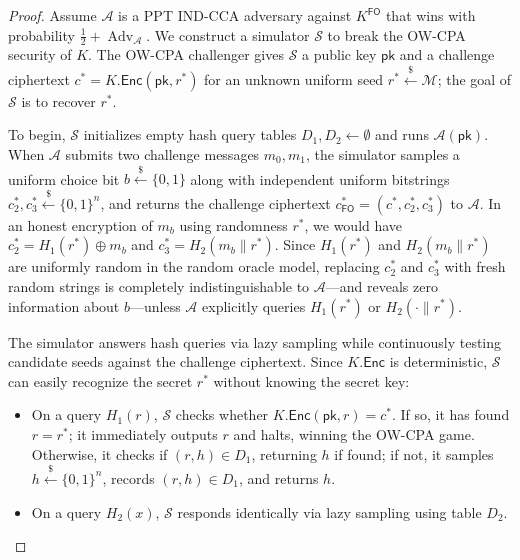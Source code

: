 \begin{proof}
    Assume \(\mathcal{A}\) is a PPT IND-CCA adversary against \(K^{\mathsf{FO}}\) that wins with probability \(\frac{1}{2} + \operatorname{Adv}_{\mathcal{A}}\).
    We construct a simulator \(\mathcal{S}\) to break the OW-CPA security of \(K\).
    The OW-CPA challenger gives \(\mathcal{S}\) a public key \(\mathsf{pk}\) and a challenge ciphertext \(c^* = K.\mathsf{Enc}(\mathsf{pk}, r^*)\) for an unknown uniform seed \(r^* \xleftarrow{\$} \mathcal{M}\); the goal of \(\mathcal{S}\) is to recover \(r^*\).

    To begin, \(\mathcal{S}\) initializes empty hash query tables \(D_1, D_2 \gets \emptyset\) and runs \(\mathcal{A}(\mathsf{pk})\).
    When \(\mathcal{A}\) submits two challenge messages \(m_0, m_1\), the simulator samples a uniform choice bit \(b \xleftarrow{\$} \{0, 1\}\) along with independent uniform bitstrings \(c_2^*, c_3^* \xleftarrow{\$} \{0, 1\}^n\), and returns the challenge ciphertext \(c_{\mathsf{FO}}^* = (c^*, c_2^*, c_3^*)\) to \(\mathcal{A}\).
    In an honest encryption of \(m_b\) using randomness \(r^*\), we would have \(c_2^* = H_1(r^*) \oplus m_b\) and \(c_3^* = H_2(m_b \parallel r^*)\).
    Since \(H_1(r^*)\) and \(H_2(m_b \parallel r^*)\) are uniformly random in the random oracle model, replacing \(c_2^*\) and \(c_3^*\) with fresh random strings is completely indistinguishable to \(\mathcal{A}\)---and reveals zero information about \(b\)---unless \(\mathcal{A}\) explicitly queries \(H_1(r^*)\) or \(H_2(\cdot \parallel r^*)\).

    The simulator answers hash queries via lazy sampling while continuously testing candidate seeds against the challenge ciphertext.
    Since \(K.\mathsf{Enc}\) is deterministic, \(\mathcal{S}\) can easily recognize the secret \(r^*\) without knowing the secret key:
    \begin{itemize}
        \item On a query \(H_1(r)\), \(\mathcal{S}\) checks whether \(K.\mathsf{Enc}(\mathsf{pk}, r) = c^*\). If so, it has found \(r = r^*\); it immediately outputs \(r\) and halts, winning the OW-CPA game. Otherwise, it checks if \((r, h) \in D_1\), returning \(h\) if found; if not, it samples \(h \xleftarrow{\$} \{0, 1\}^n\), records \((r, h) \in D_1\), and returns \(h\).
        \item On a query \(H_2(x)\), \(\mathcal{S}\) responds identically via lazy sampling using table \(D_2\).
    \end{itemize}


\end{proof}
